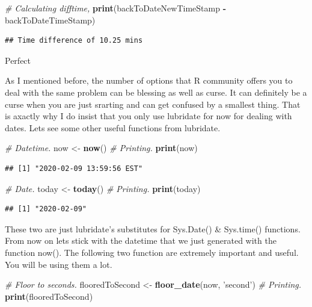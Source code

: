 \documentclass[]{book}
\newenvironment{Shaded}{\begin{snugshade}}{\end{snugshade}}
\newcommand{\CommentTok}[1]{\textcolor[rgb]{0.56,0.35,0.01}{\textit{#1}}}
\newcommand{\KeywordTok}[1]{\textcolor[rgb]{0.13,0.29,0.53}{\textbf{#1}}}
\newcommand{\NormalTok}[1]{#1}
\newcommand{\OperatorTok}[1]{\textcolor[rgb]{0.81,0.36,0.00}{\textbf{#1}}}
\newcommand{\StringTok}[1]{\textcolor[rgb]{0.31,0.60,0.02}{#1}}
\begin{document}
\begin{Shaded}
\begin{Highlighting}[]
\CommentTok{# Calculating difftime,}
\KeywordTok{print}\NormalTok{(backToDateNewTimeStamp }\OperatorTok{-}\StringTok{ }\NormalTok{backToDateTimeStamp)}
\end{Highlighting}
\end{Shaded}

\begin{verbatim}
## Time difference of 10.25 mins
\end{verbatim}

Perfect

As I mentioned before, the number of options that R community offers you to deal with the same problem can be blessing as well as curse. It can definitely be a curse when you are just srarting and can get confused by a smallest thing. That is axactly why I do insist that you only use lubridate for now for dealing with dates. Lets see some other useful functions from lubridate.

\begin{Shaded}
\begin{Highlighting}[]
\CommentTok{# Datetime.}
\NormalTok{now <-}\StringTok{ }\KeywordTok{now}\NormalTok{()}
\CommentTok{# Printing.}
\KeywordTok{print}\NormalTok{(now)}
\end{Highlighting}
\end{Shaded}

\begin{verbatim}
## [1] "2020-02-09 13:59:56 EST"
\end{verbatim}

\begin{Shaded}
\begin{Highlighting}[]
\CommentTok{# Date.}
\NormalTok{today <-}\StringTok{ }\KeywordTok{today}\NormalTok{()}
\CommentTok{# Printing.}
\KeywordTok{print}\NormalTok{(today)}
\end{Highlighting}
\end{Shaded}

\begin{verbatim}
## [1] "2020-02-09"
\end{verbatim}

These two are just lubridate's substitutes for Sys.Date() \& Sys.time() functions. From now on lets stick with the datetime that we just generated with the function now(). The following two function are extremely important and useful. You will be using them a lot.

\begin{Shaded}
\begin{Highlighting}[]
\CommentTok{# Floor to seconds.}
\NormalTok{flooredToSecond <-}\StringTok{ }\KeywordTok{floor_date}\NormalTok{(now, }\StringTok{'second'}\NormalTok{)}
\CommentTok{# Printing.}
\KeywordTok{print}\NormalTok{(flooredToSecond)}
\end{Highlighting}
\end{Shaded}
\end{document}
